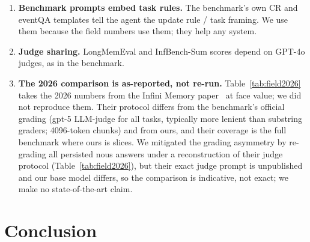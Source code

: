 \documentclass{article}
\newcommand{\nous}{\textsf{nous}}
\begin{document}
\begin{enumerate}
        \texttt{chunks\_sent}/\texttt{chunks\_truncated} on every persisted
        result row, and truncated instances are excluded from headline
        aggregates by construction.
  \item \textbf{Benchmark prompts embed task rules.} The benchmark's own CR
        and eventQA templates tell the agent the update rule / task framing.
        We use them because the field numbers use them; they help any
        system.
  \item \textbf{Judge sharing.} LongMemEval and InfBench-Sum scores depend on
        GPT-4o judges, as in the benchmark.
  \item \textbf{The 2026 comparison is as-reported, not re-run.}
        Table~\ref{tab:field2026} takes the 2026 numbers from the Infini
        Memory paper~\cite{infini} at face value; we did not reproduce them.
        Their protocol differs from the benchmark's official grading (gpt-5
        LLM-judge for all tasks, typically more lenient than substring
        graders; 4096-token chunks) and from ours, and their coverage is the
        full benchmark where ours is slices. We mitigated the grading
        asymmetry by re-grading all persisted \nous{} answers under a
        reconstruction of their judge protocol
        (Table~\ref{tab:field2026}), but their exact judge prompt is
        unpublished and our base model differs, so the comparison is
        indicative, not exact; we make no state-of-the-art claim.
\end{enumerate}

\section{Conclusion}
\end{document}
